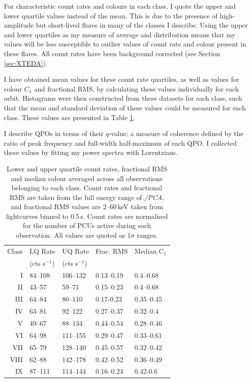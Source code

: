 \par For characteristic count rates and colours in each class, I quote the upper and lower quartile values \citep{Kenney_Quartile} instead of the mean.  This is due to the presence of high-amplitude but short-lived flares in many of the classes I describe.  Using the upper and lower quartiles as my measure of average and distribution means that my values will be less susceptible to outlier values of count rate and colour present in these flares.  All count rates have been background corrected (see Section \ref{sec:XTEDA}).
\par I have obtained mean values for these count rate quartiles, as well as values for colour $C_1$ and fractional RMS, by calculating these values individually for each orbit.  Histograms were then constructed from these datasets for each class, such that the mean and standard deviation of these values could be measured for each class.  These values are presented in Table \ref{tab:basicparams}.
\par I describe QPOs in terms of their $q$-value; a measure of coherence defined by the ratio of peak frequency and full-width half-maximum of each QPO.  I collected these values by fitting my power spectra with Lorentzians.

\begin{table}
\centering
\begin{tabular}{rllll} %
\hline
\hline
\scriptsize Class &\scriptsize LQ Rate &\scriptsize  UQ Rate &\scriptsize Frac. RMS &\scriptsize Median C$_1$\\
\scriptsize &\scriptsize (cts s$^{-1}$) &\scriptsize (cts s$^{-1}$) & & \\
\hline
I&84--108&106--132&0.13--0.19&0.4--0.68\\
II&43--57&59--71&0.15--0.23&0.4--0.68\\
III&64--84&80--110&0.17-0.23&0.35--0.45\\
IV&63--81&92--122&0.27--0.37&0.32--0.4\\
V&49--67&88--134&0.44--0.54&0.28--0.46\\
VI&64--98&111--155&0.29--0.47&0.33--0.61\\
VII&65--79&128--140&0.45--0.57&0.32--0.42\\
VIII&62--88&142--178&0.42--0.52&0.36--0.49\\
IX&87--111&114--144&0.16--0.24&0.42-0.6\\
\hline
\hline
\end{tabular}
\caption[A number of statistics averaged across all observations belonging to each IGR J17091 variability class.]{Lower and upper quartile count rates, fractional RMS and median colour averaged across all observations belonging to each class.  Count rates and fractional RMS are taken from the full energy range of \rxte\textit{/PCA}, and fractional RMS values are 2--60\,keV taken from lightcurves binned to 0.5\,s.  Count rates are normalised for the number of PCUs active during each observation.  All values are quoted as $1\sigma$ ranges.}
\label{tab:basicparams}
\end{table}


